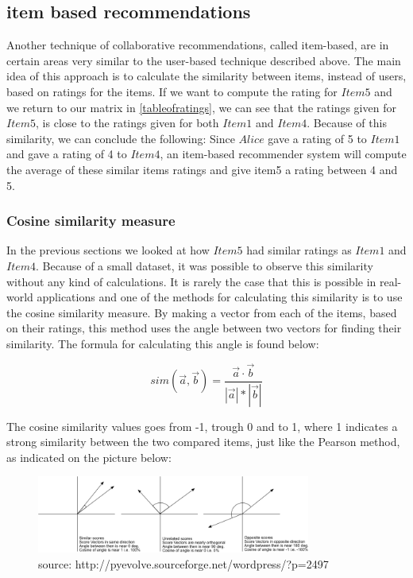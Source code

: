 \subsection{item based recommendations} %
\label{sub:item_based_recommendations}
Another technique of collaborative recommendations, called item-based, are in certain areas very similar to the user-based technique described above. The main idea of this approach is to calculate the similarity between items, instead of users, based on ratings for the items. If we want to compute the rating for \(Item5\) and we return to our matrix in \ref{tableofratings}, we can see that the ratings given for \(Item5\), is close to the ratings given for both \(Item1\) and \(Item4\). Because of this similarity, we can conclude the following: Since \(Alice\) gave a rating of 5 to \(Item1\) and gave a rating of 4 to \(Item4\), an item-based recommender system will compute the average of these similar items ratings and give item5 a rating between 4 and 5.

\subsubsection{Cosine similarity measure}
In the previous sections we looked at how \(Item5\) had similar ratings as \(Item1\) and \(Item4\). Because of a small dataset, it was possible to observe this similarity without any kind of calculations. It is rarely the case that this is possible in real-world applications and one of the methods for calculating this similarity is to use the cosine similarity measure. \newline 
By making a vector from each of the items, based on their ratings, this method uses the angle between two vectors for finding their similarity. The formula for calculating this angle is found below:

\[
	sim(\vec{a}, \vec{b}) = \frac{\vec{a} \cdot \vec{b}}{|\vec{a}| * |\vec{b}| }
\]


The cosine similarity values goes from -1, trough 0 and to 1, where 1 indicates a strong similarity between the two compared items, just like the Pearson method, as indicated on the picture below:

\begin{figure}[H]
\centering
\includegraphics[width=90mm]{Pictures/cosinesimilarity.png}
\caption{source: http://pyevolve.sourceforge.net/wordpress/?p=2497}
\label{cosinesimilarity}
\end{figure}

